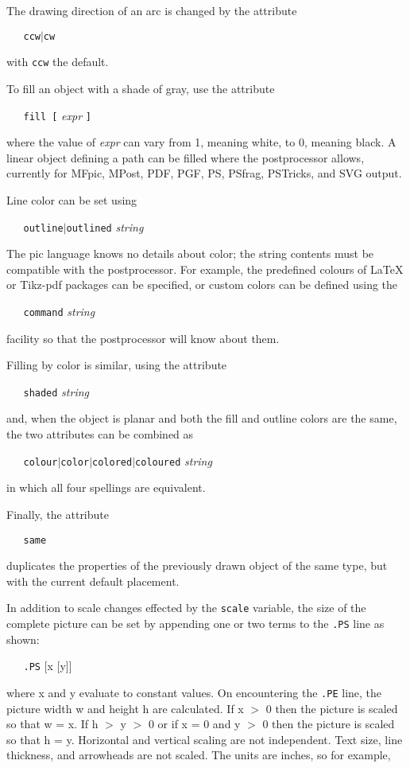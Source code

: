 The drawing direction of an arc is changed by the attribute

{\tt \ \ \ ccw$|$cw}

with
{\tt ccw}
the default.

To fill an object with a shade of gray, use the attribute

{\tt \ \ \ fill\ [}
{\it expr}
{\tt ]}

where the value of
{\it expr}
can vary from 1, meaning white, to 0, meaning black.
A linear object defining a path can be filled where the postprocessor allows,
currently for MFpic, MPost, PDF, PGF, PS, PSfrag, PSTricks, and SVG output.

Line color can be set using

{\tt \ \ \ outline$|$outlined}
{\it string}

The pic language knows no details about color; the string contents must be
compatible with the postprocessor.
For example,
the predefined colours of LaTeX or Tikz-pdf packages can be specified,
or custom colors can be defined using the

{\tt \ \ \ command}
{\it string}

facility so that the postprocessor will know about them.

Filling by color is similar, using the attribute

{\tt \ \ \ shaded}
{\it string}

and, when the object is planar and both the fill and outline colors
are the same, the two attributes can be combined as

{\tt \ \ \ colour$|$color$|$colored$|$coloured}
{\it string}

in which all four spellings are equivalent.

Finally, the attribute

{\tt \ \ \ same}

duplicates the properties of the previously drawn object of the same type,
but with the current default placement.

In addition to scale changes effected by the
{\tt scale}
variable, the size of the complete picture can be set
by appending one or two terms to the
{\tt .PS}
line as shown:

{\tt \ \ \ .PS}
[x [y]]

where x and y evaluate to constant values.
On encountering the 
{\tt .PE}
line, the picture width w and height h are calculated.
If x $>$ 0 then the picture is scaled so that w = x.
If h $>$ y $>$ 0 or if x = 0 and y $>$ 0 then the picture is scaled
so that h = y.
Horizontal and vertical scaling are not independent.
Text size, line thickness, and arrowheads are not scaled.
The units are inches, so for example,

